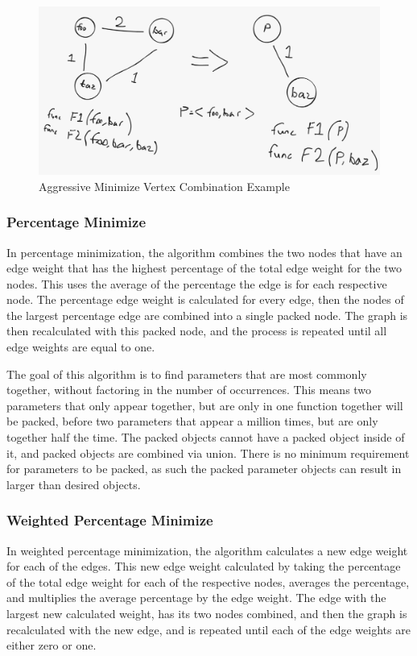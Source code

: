 \documentclass{article}
\begin{document}
\begin{figure}[ht]
    \includegraphics[width=\linewidth]{im7.png}
    \caption{Aggressive Minimize Vertex Combination Example}
    \label{fig:agmin_example}
\end{figure}


\subsubsection{Percentage Minimize}

In percentage minimization, the algorithm combines the two nodes that have an edge weight that has the highest percentage of the total edge weight for the two nodes. This uses the average of the percentage the edge is for each respective node. The percentage edge weight is calculated for every edge, then the nodes of the largest percentage edge are combined into a single packed node. The graph is then recalculated with this packed node, and the process is repeated until all edge weights are equal to one.

The goal of this algorithm is to find parameters that are most commonly together, without factoring in the number of occurrences. This means two parameters that only appear together, but are only in one function together will be packed, before two parameters that appear a million times, but are only together half the time. The packed objects cannot have a packed object inside of it, and packed objects are combined via union. There is no minimum requirement for parameters to be packed, as such the packed parameter objects can result in larger than desired objects. 


\subsubsection{Weighted Percentage Minimize}
In weighted percentage minimization, the algorithm calculates a new edge weight for each of the edges. This new edge weight calculated by taking the percentage of the total edge weight for each of the respective nodes, averages the percentage, and multiplies the average percentage by the edge weight. The edge with the largest new calculated weight, has its two nodes combined, and then the graph is recalculated with the new edge, and is repeated until each of the edge weights are either zero or one.
\end{document}
